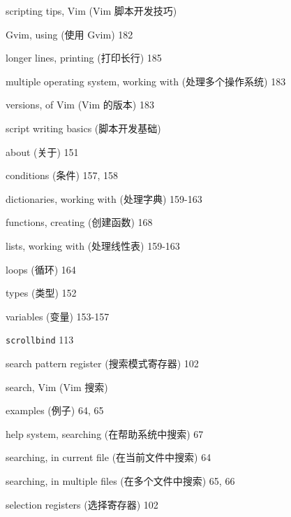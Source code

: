 \begin{multicols}{2}
\hangindent=3pc  scripting tips, Vim (Vim 脚本开发技巧) \par
\hangindent=3pc \quad Gvim, using (使用 Gvim) 182 \par
\hangindent=3pc \quad longer lines, printing (打印长行) 185 \par
\hangindent=3pc \quad multiple operating system, working with (处理多个操作系统) 183 \par
\hangindent=3pc \quad versions, of Vim (Vim 的版本) 183 \par

\hangindent=3pc  script writing basics (脚本开发基础) \par
\hangindent=3pc \quad about (关于) 151 \par
\hangindent=3pc \quad conditions (条件) 157, 158 \par
\hangindent=3pc \quad dictionaries, working with (处理字典) 159-163 \par
\hangindent=3pc \quad functions, creating (创建函数) 168 \par
\hangindent=3pc \quad lists, working with (处理线性表) 159-163 \par
\hangindent=3pc \quad loops (循环) 164 \par
\hangindent=3pc \quad types (类型) 152 \par
\hangindent=3pc \quad variables (变量) 153-157 \par

\hangindent=3pc  \texttt{scrollbind} 113

\hangindent=3pc  search pattern register (搜索模式寄存器) 102

\hangindent=3pc  search, Vim (Vim 搜索) \par
\hangindent=3pc \quad examples (例子) 64, 65 \par
\hangindent=3pc \quad help system, searching (在帮助系统中搜索) 67 \par
\hangindent=3pc \quad searching, in current file (在当前文件中搜索) 64 \par
\hangindent=3pc \quad searching, in multiple files (在多个文件中搜索) 65, 66 \par

\hangindent=3pc  selection registers (选择寄存器) 102


\end{multicols}
